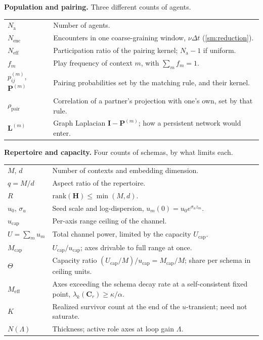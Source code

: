 \documentclass[
  aps,prx,
  preprint,
  superscriptaddress,
  nofootinbib
]{revtex4-2}
\newcommand{\Cr}{\mathbf{C}_r}
\newcommand{\Id}{\mathbf{I}}
\newcommand{\rhopair}{\rho_{\mathrm{pair}}}
\newcommand{\Nag}{N_{\mathrm{a}}}
\begin{document}
{\smallskip\noindent\textbf{Population and pairing.} Three different counts of agents.\\[3pt]
\begin{tabular}{@{}l@{\hspace{1.6em}}l@{}}
\toprule
$\Nag$ & Number of agents. \\
$N_{\mathrm{enc}}$ & Encounters in one coarse-graining window, $\nu\Delta t$ (\cref{sm:reduction}). \\
$N_{\mathrm{eff}}$ & Participation ratio of the pairing kernel; $\Nag-1$ if uniform. \\
$f_m$ & Play frequency of context $m$, with $\sum_m f_m=1$. \\
$p^{(m)}_{ij}$, $\bm P^{(m)}$ & Pairing probabilities set by the matching rule, and their kernel. \\
$\rhopair$ & Correlation of a partner's projection with one's own, set by that rule. \\
$\bm L^{(m)}$ & Graph Laplacian $\Id-\bm P^{(m)}$; how a persistent network would enter. \\
\bottomrule
\end{tabular}

\smallskip\noindent\textbf{Repertoire and capacity.} Four counts of schemas, by what limits each.\\[3pt]
\begin{tabular}{@{}l@{\hspace{1.6em}}l@{}}
\toprule
$M$, $d$ & Number of contexts and embedding dimension. \\
$q=M/d$ & Aspect ratio of the repertoire. \\
$R$ & $\mathrm{rank}(\bm H)\le\min(M,d)$. \\
$u_0$, $\sigma_u$ & Seed scale and log-dispersion, $u_m(0)=u_0e^{\sigma_u z_m}$. \\
$u_{\mathrm{cap}}$ & Per-axis range ceiling of the channel. \\
$U=\sum_m u_m$ & Total channel power, limited by the capacity $U_{\mathrm{cap}}$. \\
$M_{\mathrm{cap}}$ & $U_{\mathrm{cap}}/u_{\mathrm{cap}}$; axes drivable to full range at once. \\
$\Theta$ & Capacity ratio $(U_{\mathrm{cap}}/M)/u_{\mathrm{cap}}=M_{\mathrm{cap}}/M$; share per schema in ceiling units. \\
$M_{\mathrm{eff}}$ & Axes exceeding the schema decay rate at a self-consistent fixed point, $\lambda_k(\Cr)\ge\kappa/\alpha$. \\
$K$ & Realized survivor count at the end of the $u$-transient; need not saturate. \\
$N(\Lambda)$ & Thickness; active role axes at loop gain $\Lambda$. \\
\bottomrule
\end{tabular}

}
\end{document}
